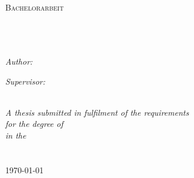 \documentclass[11pt, a4paper, oneside]{Thesis} %
\begin{document}
\begin{titlepage}
\begin{center}

\textsc{\LARGE \univname}\\[1.5cm] %
\textsc{\Large Bachelorarbeit}\\[0.5cm] %

\HRule \\[0.4cm] %
{\huge \bfseries \ttitle}\\[0.4cm] %
\HRule \\[1.5cm] %
 
\begin{minipage}{0.4\textwidth}
\begin{flushleft} \large
\emph{Author:}\\
\authornames %
\end{flushleft}
\end{minipage}
\begin{minipage}{0.4\textwidth}
\begin{flushright} \large
\emph{Supervisor:} \\
\supname%
\end{flushright}
\end{minipage}\\[3cm]
 
\large \textit{A thesis submitted in fulfilment of the requirements\\ for the degree of \degreename}\\[0.3cm] %
\textit{in the}\\[0.4cm]
\groupname\\\deptname\\[2cm] %
 
{\large \today}\\[4cm] %
 
\vfill
\end{center}

\end{titlepage}

\end{document}
